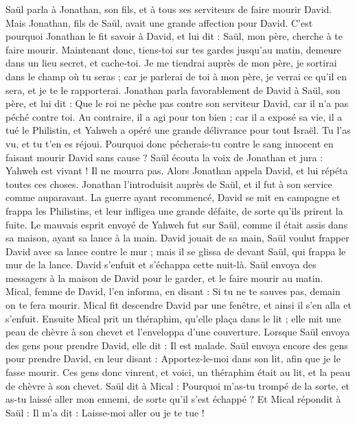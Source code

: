 \begin{multicols}{2}
\VerseOne{}Saül parla à Jonathan, son fils, et à tous ses serviteurs de faire mourir David.
Mais Jonathan, fils de Saül, avait une grande affection pour David. C'est pourquoi Jonathan le fit savoir à David, et lui dit : Saül, mon père, cherche à te faire mourir. Maintenant donc, tiens-toi sur tes gardes jusqu'au matin, demeure dans un lieu secret, et cache-toi.
Je me tiendrai auprès de mon père, je sortirai dans le champ où tu seras ; car je parlerai de toi à mon père, je verrai ce qu'il en sera, et je te le rapporterai.
Jonathan parla favorablement de David à Saül, son père, et lui dit : Que le roi ne pèche pas contre son serviteur David, car il n'a pas péché contre toi. Au contraire, il a agi pour ton bien ;
car il a exposé sa vie, il a tué le Philistin, et Yahweh a opéré une grande délivrance pour tout Israël. Tu l'as vu, et tu t'en es réjoui. Pourquoi donc pécherais-tu contre le sang innocent en faisant mourir David sans cause ?
Saül écouta la voix de Jonathan et jura : Yahweh est vivant ! Il ne mourra pas.
Alors Jonathan appela David, et lui répéta toutes ces choses. Jonathan l'introduisit auprès de Saül, et il fut à son service comme auparavant.
La guerre ayant recommencé, David se mit en campagne et frappa les Philistins, et leur infligea une grande défaite, de sorte qu'ils prirent la fuite.
Le mauvais esprit envoyé de Yahweh fut sur Saül, comme il était assis dans sa maison, ayant sa lance à la main. David jouait de sa main,
Saül voulut frapper David avec sa lance contre le mur ; mais il se glissa de devant Saül, qui frappa le mur de la lance. David s'enfuit et s'échappa cette nuit-là.
Saül envoya des messagers à la maison de David pour le garder, et le faire mourir au matin. Mical, femme de David, l'en informa, en disant : Si tu ne te sauves pas, demain on te fera mourir.
Mical fit descendre David par une fenêtre, et ainsi il s'en alla et s'enfuit.
Ensuite Mical prit un théraphim, qu'elle plaça dans le lit ; elle mit une peau de chèvre à son chevet et l'enveloppa d'une couverture.
Lorsque Saül envoya des gens pour prendre David, elle dit : Il est malade.
Saül envoya encore des gens pour prendre David, en leur disant : Apportez-le-moi dans son lit, afin que je le fasse mourir.
Ces gens donc vinrent, et voici, un théraphim était au lit, et la peau de chèvre à son chevet.
Saül dit à Mical : Pourquoi m'as-tu trompé de la sorte, et as-tu laissé aller mon ennemi, de sorte qu'il s'est échappé ? Et Mical répondit à Saül : Il m'a dit : Laisse-moi aller ou je te tue !

\end{multicols}
